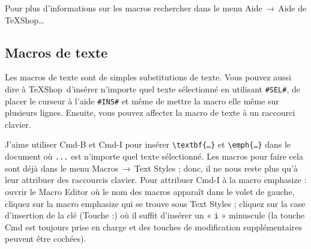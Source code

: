 \documentclass[11pt,french]{article}
\newcommand{\TS}{\textsf{\TeX Shop}}
\newcommand{\cmd}[1]{\textsf{#1}}
\newcommand{\mnu}[1]{\textsf{#1}}
\newcommand{\To}{\,\(\to\)\,}
\begin{document}
Pour plus d'informations sur les \cmd{macros} rechercher dans le menu \mnu{Aide}\To\mnu{Aide de TeXShop…}


\subsection{Macros de texte}

Les macros de texte sont de simples substitutions de texte. Vous pouvez aussi dire à \TS\ d'insérer n'importe quel texte sélectionné en utilisant \verb|#SEL#|, de placer le curseur à l'aide \verb|#INS#| et même de mettre la macro elle même sur plusieurs lignes. Ensuite, vous pouvez affecter la macro de texte à un raccourci clavier.

J'aime utiliser \cmd{Cmd-B} et \cmd{Cmd-I} pour insérer \verb|\textbf{…}| et \verb|\emph{…}| dans le document où \texttt {...} est n'importe quel texte sélectionné. Les macros pour faire cela sont déjà dans le menu \mnu{Macros}\To\mnu{Text Styles} ; donc, il ne nous reste plus qu'à leur attribuer des raccourcis clavier. Pour attribuer \cmd{Cmd-I} à la macro \mnu{emphasize} : ouvrir le \mnu{Macro Editor} où le nom des macros apparaît dans le volet de gauche, cliquez sur la macro \mnu{emphasize} qui se trouve sous \mnu{Text Styles} ; cliquez sur la case d'insertion de la clé (\mnu{Touche :}) où il suffit d'insérer un « \texttt{i} » minuscule (la touche \cmd{Cmd} est toujours prise en charge et des touches de modification supplémentaires peuvent être cochées).

%
\end{document}
